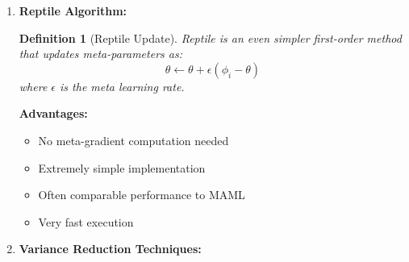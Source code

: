 \documentclass[12pt]{article}
\newtheorem{definition}{Definition}
\begin{document}
{{\begin{enumerate}
				\begin{algorithm}[H]
				\caption{First-Order MAML}
				\begin{algorithmic}[1]
				\STATE \textbf{Input:} Meta-parameters $\theta$, task $\mathcal{T}_i$, learning rates $\alpha, \beta$
				\STATE Sample support set $D_i^{train}$ from $\mathcal{T}_i$
				\STATE Compute adapted parameters: $\phi_i = \theta - \alpha\nabla_\theta \mathcal{L}_{\mathcal{T}_i}(\theta, D_i^{train})$
				\STATE Sample query set $D_i^{test}$ from $\mathcal{T}_i$
				\STATE Compute meta-gradient: $\nabla_{\phi_i} \mathcal{L}_{\mathcal{T}_i}(\phi_i, D_i^{test})$
				\STATE Meta-update: $\theta \leftarrow \theta - \beta \nabla_{\phi_i} \mathcal{L}_{\mathcal{T}_i}(\phi_i, D_i^{test})$
				\end{algorithmic}
				\end{algorithm}
				
				\textbf{Benefits:}
				\begin{itemize}
					\item Much faster computation (2-3x speedup)
					\item Lower memory requirements
					\item Often achieves 80-90\% of full MAML performance
					\item More stable optimization
				\end{itemize}
				
				\item \textbf{Reptile Algorithm:}
				
				\begin{definition}[Reptile Update]
				Reptile is an even simpler first-order method that updates meta-parameters as:
				\begin{equation}
				\theta \leftarrow \theta + \epsilon(\phi_i - \theta)
				\end{equation}
				where $\epsilon$ is the meta learning rate.
				\end{definition}
				
				\textbf{Advantages:}
				\begin{itemize}
					\item No meta-gradient computation needed
					\item Extremely simple implementation
					\item Often comparable performance to MAML
					\item Very fast execution
				\end{itemize}
				
				\item \textbf{Variance Reduction Techniques:}
				

\end{enumerate}}}
\end{document}
